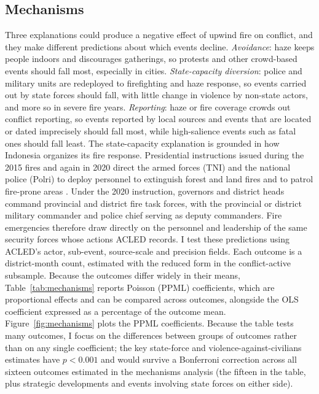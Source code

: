 \documentclass[12pt]{article}
\begin{document}
\subsection{Mechanisms}
\label{sec:mechanisms}

Three explanations could produce a negative effect of upwind fire on conflict, and they make different predictions about which events decline. \emph{Avoidance}: haze keeps people indoors and discourages gatherings, so protests and other crowd-based events should fall most, especially in cities. \emph{State-capacity diversion}: police and military units are redeployed to firefighting and haze response, so events carried out by state forces should fall, with little change in violence by non-state actors, and more so in severe fire years. \emph{Reporting}: haze or fire coverage crowds out conflict reporting, so events reported by local sources and events that are located or dated imprecisely should fall most, while high-salience events such as fatal ones should fall least. The state-capacity explanation is grounded in how Indonesia organizes its fire response. Presidential instructions issued during the 2015 fires and again in 2020 direct the armed forces (TNI) and the national police (Polri) to deploy personnel to extinguish forest and land fires and to patrol fire-prone areas \citep{inpres11_2015, inpres3_2020}. Under the 2020 instruction, governors and district heads command provincial and district fire task forces, with the provincial or district military commander and police chief serving as deputy commanders. Fire emergencies therefore draw directly on the personnel and leadership of the same security forces whose actions ACLED records. I test these predictions using ACLED's actor, sub-event, source-scale and precision fields. Each outcome is a district-month count, estimated with the reduced form in the conflict-active subsample. Because the outcomes differ widely in their means, Table~\ref{tab:mechanisms} reports Poisson (PPML) coefficients, which are proportional effects and can be compared across outcomes, alongside the OLS coefficient expressed as a percentage of the outcome mean. Figure~\ref{fig:mechanisms} plots the PPML coefficients. Because the table tests many outcomes, I focus on the differences between groups of outcomes rather than on any single coefficient; the key state-force and violence-against-civilians estimates have $p<0.001$ and would survive a Bonferroni correction across all sixteen outcomes estimated in the mechanisms analysis (the fifteen in the table, plus strategic developments and events involving state forces on either side).
\end{document}
